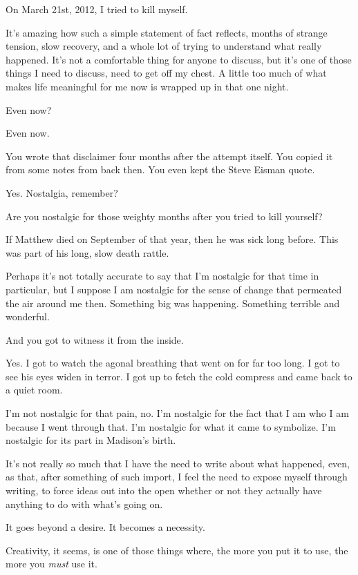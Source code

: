 \noindent On March 21st, 2012, I tried to kill myself.

It's amazing how such a simple statement of fact reflects, months of strange tension, slow recovery, and a whole lot of trying to understand what really happened. It's not a comfortable thing for anyone to discuss, but it's one of those things I need to discuss, need to get off my chest. A little too much of what makes life meaningful for me now is wrapped up in that one night.

\begin{ally}
Even now?
\end{ally}
Even now.

\begin{ally}
You wrote that disclaimer four months after the attempt itself. You copied it from some notes from back then. You even kept the Steve Eisman quote.
\end{ally}
Yes. Nostalgia, remember?

\begin{ally}
Are you nostalgic for those weighty months after you tried to kill yourself?
\end{ally}
If Matthew died on September of that year, then he was sick long before. This was part of his long, slow death rattle.

Perhaps it's not totally accurate to say that I'm nostalgic for that time in particular, but I suppose I am nostalgic for the sense of change that permeated the air around me then. Something big was happening. Something terrible and wonderful.

\begin{ally}
And you got to witness it from the inside.
\end{ally}
Yes. I got to watch the agonal breathing that went on for far too long. I got to see his eyes widen in terror. I got up to fetch the cold compress and came back to a quiet room.

I'm not nostalgic for that pain, no. I'm nostalgic for the fact that I am who I am because I went through that. I'm nostalgic for what it came to symbolize. I'm nostalgic for its part in Madison's birth.
\newpage

\noindent It's not really so much that I have the need to write about what happened, even, as that, after something of such import, I feel the need to expose myself through writing, to force ideas out into the open whether or not they actually have anything to do with what's going on.

\begin{ally}
It goes beyond a desire. It becomes a necessity.
\end{ally}
Creativity, it seems, is one of those things where, the more you put it to use, the more you \emph{must} use it.

